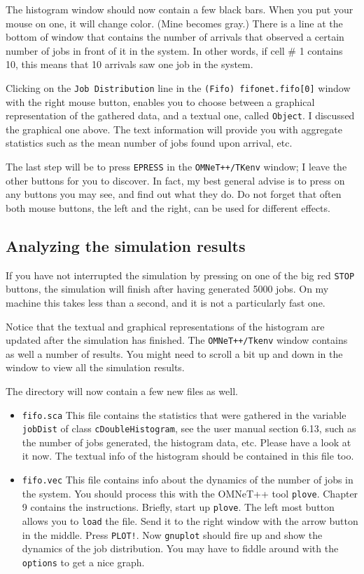 \documentclass[a4paper]{article}
\begin{document}
The histogram window should now contain a few black bars. When you put
your mouse on one, it will change color. (Mine becomes gray.) There is
a line at the bottom of window that contains the number of arrivals
that observed a certain number of jobs in front of it in the system.
In other words, if cell \# 1 contains 10, this means that 10 arrivals
saw one job in the system.

Clicking on the \texttt{Job Distribution} line in the
\texttt{(Fifo) fifonet.fifo[0]} window with the right mouse button, enables
you to choose between a graphical representation of the gathered data,
and a textual one, called \texttt{Object}. I discussed the graphical
one above. The text information will provide you with aggregate statistics
such as the mean number of jobs found upon arrival, etc.

The last step will be to press \texttt{EPRESS} in the
\texttt{OMNeT++/TKenv} window; I leave the other
buttons for you to discover. In fact, my best general advise is to
press on any buttons you may see, and find out what they do. Do not
forget that often both mouse buttons, the left and the right, can be
used for different effects.


\subsection{Analyzing the simulation results}
\label{sec:interpreting-results}
If you have not interrupted the simulation by pressing on one of the
big red \texttt{STOP} buttons, the simulation will finish
after having generated 5000 jobs. On my machine this takes less than a
second, and it is not a particularly fast one. 

Notice that the textual and graphical representations of the histogram
are updated after the simulation has finished. The
\texttt{OMNeT++/Tkenv} window contains as well a number of results.
You might need to scroll a bit up and down in the window to view all
the simulation results.

The directory will now contain a few new files as well. 
\begin{itemize}
\item \texttt{fifo.sca} This file contains the statistics that were
  gathered in the variable \texttt{jobDist} of class
  \texttt{cDoubleHistogram}, see the user manual section 6.13, such as
  the number of jobs generated, the histogram data, etc. Please have a
  look at it now.  The textual info of the histogram should be
  contained in this file too.
\item \texttt{fifo.vec} This file contains info about the dynamics of
  the number of jobs in the system. You should process this with the
  OMNeT++ tool \texttt{plove}. Chapter 9 contains the instructions.
  Briefly, start up \texttt{plove}. The left most button allows you to
  \texttt{load} the file. Send it to the right window with the arrow
  button in the middle. Press \texttt{PLOT!}. Now \texttt{gnuplot}
  should fire up and show the dynamics of the job distribution. You
  may have to fiddle around with the \texttt{options} to get a nice
  graph.
\end{itemize}
\end{document}
